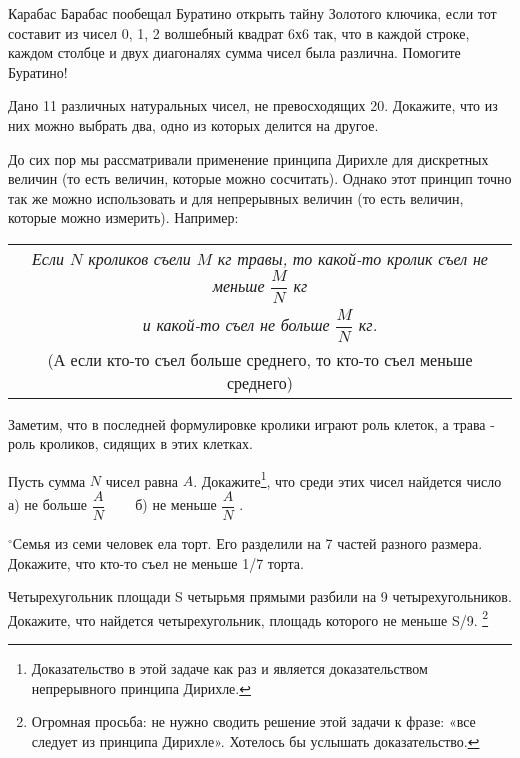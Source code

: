 \begin{thm}
	Карабас Барабас пообещал Буратино открыть тайну Золотого ключика, если тот составит из чисел 0, 1, 2 волшебный квадрат 6х6 так, что в каждой строке, каждом столбце и двух диагоналях сумма чисел была различна. Помогите Буратино!
\end{thm}

\begin{thm}
	Дано 11 различных натуральных чисел, не превосходящих 20. Докажите, что из них можно выбрать два, одно из которых делится на другое. 
\end{thm}



До сих пор мы рассматривали применение принципа Дирихле для дискретных величин (то есть величин, которые можно сосчитать). Однако этот принцип точно так же можно использовать и для непрерывных величин (то есть величин, которые можно измерить). Например:

\begin{table}[h]
	\centering	
	\begin{tabular}{|c|}
		\hline
		\textit{Если $N$ кроликов съели $M$ кг травы,} \textit{то какой-то кролик съел не меньше $\dfrac{M}{N}$ кг }\\
		\textit{и какой-то съел не больше $\dfrac{M}{N}$ кг.}\\(А если кто-то съел больше среднего, то кто-то съел меньше среднего)\\\hline
	\end{tabular}
\end{table}
Заметим, что в последней формулировке кролики играют роль клеток, а трава - роль кроликов, сидящих в этих клетках.

\begin{thm}
	Пусть сумма $N$ чисел равна $A$. Докажите\footnote{Доказательство в этой задаче как раз и является доказательством непрерывного принципа Дирихле.}, что среди этих чисел найдется число  а) не больше $\dfrac{A}{N}$ ~~~ б) не меньше $\dfrac{A}{N}$ .
\end{thm}

\begin{thm}
	$^\circ$Семья из семи человек ела торт. Его разделили на 7 частей разного размера. Докажите, что кто-то съел не меньше 1/7 торта.
\end{thm}

\begin{thm}
	Четырехугольник площади S четырьмя прямыми разбили на 9 четырехугольников. Докажите, что найдется четырехугольник, площадь которого не меньше S/9. \footnote{Огромная просьба: не нужно сводить решение этой задачи к фразе: «все следует из принципа Дирихле». Хотелось бы услышать доказательство.}
\end{thm}

